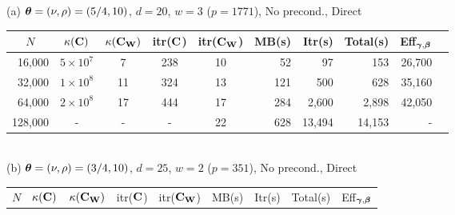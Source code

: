 \documentclass[11pt,final]{amsart}       %
\begin{document}
\begin{table*}[htbp]
  \caption{Computing Kriging for the n-sphere data set with $d = 20$
    and $d = 25$ dimensions, TD index set, and Mat\'{e}rn covariance
    function without pre-conditioner. The residual accuracy is set to
    $\varepsilon = 10^{-3}$. Since the dimension is greater than 3,
    the matrix vector products are computed directly with the GPU and
    CPU.  The description of the columns of tables (a) and (b) are the
    same as for Table \ref{numericalresults:table3}. In addition,
    column 6 corresponds to the wall clock time for computing the
    multilevel basis. (a) Computational times for solving the Kriging
    prediction for $d = 20$ and $\theta = (5/4,10)$.  The growth in
    computational cost is slightly faster than quadratic due to the
    lack of fast summation method in higher dimensions. However,
    compared to the single level iterative approach it is
    approximately 42,000 faster for $N = 64,000$ observations. (b)
    Kriging prediction for $d = 25$ and $\theta = (5/4,10)$. The
    growth in computational cost is similar.  The efficiency of this
    method is about 2,840 times faster for $N = 64,000$ observations.}
\begin{center}
(a) $\boldsymbol{\theta} = (\nu,\rho) = (5/4,10)$, $d = 20$, $w = 3$ ($p =
1771$), No precond., Direct \\
\begin{tabular} { r c c c  c r r r r r}
  \multicolumn{1}{c}{$N$} & $\kappa (\mathbf{C})$ & $\kappa (\mathbf{C}_{\mathbf{W}})$ &
 itr($\mathbf{C}$)
  & 
 itr($\mathbf{C}_{\mathbf{W}}$) &  MB(s) & Itr(s) & Total(s) &  Eff$_{\boldsymbol{\gamma},\boldsymbol{\beta}}$ \\
  \hline
 16,000  & $5  \times 10^{7}$ & 7  & 238 & 10  &  52  &      97   &    153 & 26,700   \\
 32,000  & $1 \times 10^{8}$  & 11 & 324 & 13  & 121  &     500   &    628 & 35,160   \\
 64,000  & $2 \times 10^{8}$  & 17 & 444 & 17  & 284  &   2,600   &  2,898 & 42,050 \\
128,000  &  -                & -  &  - & 22  & 628  &  13,494   &  14,153 & -  \\
\end{tabular}\\
\bigskip
(b) $\boldsymbol{\theta} = (\nu,\rho) = (3/4,10)$, $d = 25$, $w = 2$ ($p = 351$), No precond., Direct \\
\begin{tabular} { r c c c c r r r r}
  \multicolumn{1}{c}{$N$} & $\kappa (\mathbf{C})$ & $\kappa (\mathbf{C}_{\mathbf{W}})$
  & itr($\mathbf{C}$)
  & itr($\mathbf{C}_{\mathbf{W}}$) & MB(s) & Itr(s) & Total(s) & Eff$_{\boldsymbol{\gamma},\boldsymbol{\beta}}$ \\

\end{tabular}
\end{center}
\end{table*}
\end{document}
